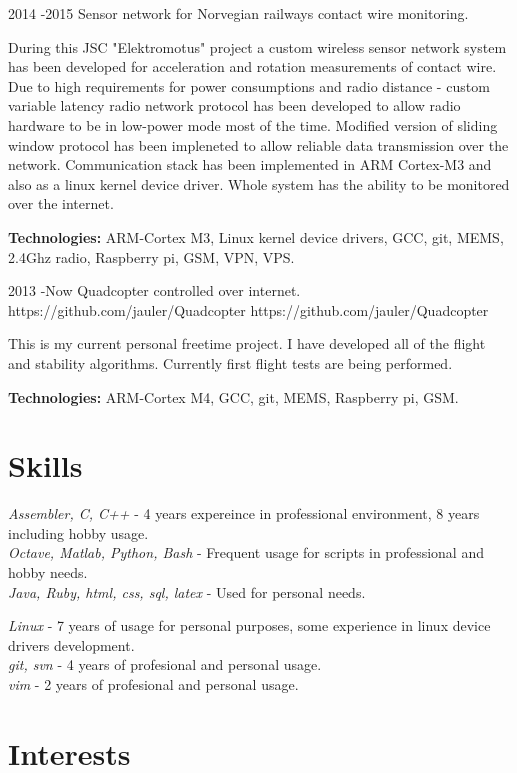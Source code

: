 \documentclass[12]{article}
\begin{document}
\job
{2014 -}{2015}
{Sensor network for Norvegian railways contact wire monitoring.}
{}
{}
{
During this JSC "Elektromotus" project a custom wireless sensor network system has been developed for acceleration and rotation measurements of contact wire.
Due to high requirements for power consumptions and radio distance - custom variable latency radio network protocol has been developed to allow radio hardware to be in low-power mode most of the time.
Modified version of sliding window protocol has been impleneted to allow reliable data transmission over the network.
Communication stack has been implemented in ARM Cortex-M3 and also as a linux kernel device driver.
Whole system has the ability to be monitored over the internet.\\
\rule{0mm}{5mm}\textbf{Technologies:} ARM-Cortex M3, Linux kernel device drivers, GCC, git, MEMS, 2.4Ghz radio, Raspberry pi, GSM, VPN, VPS.}

\job
{2013 -}{Now}
{Quadcopter controlled over internet.}
{https://github.com/jauler/Quadcopter}
{https://github.com/jauler/Quadcopter}
{
This is my current personal freetime project.
I have developed all of the flight and stability algorithms.
Currently first flight tests are being performed.\\
\rule{0mm}{5mm}\textbf{Technologies:} ARM-Cortex M4, GCC, git, MEMS, Raspberry pi, GSM.}


\section{Skills}

{
	\textit{Assembler, C, C++} - 4 years expereince in professional environment, 8 years including hobby usage.\\
	\textit{Octave, Matlab, Python, Bash} - Frequent usage for scripts in professional and hobby needs.\\
	\textit{Java, Ruby, html, css, sql, latex} - Used for personal needs. \\

}

{
	\textit{Linux} - 7 years of usage for personal purposes, some experience in linux device drivers development.\\
	\textit{git, svn} - 4 years of profesional and personal usage.\\
	\textit{vim} - 2 years of profesional and personal usage.\\
}


\section{Interests}

\end{document}

